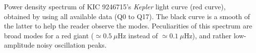 \label{fig:seismo} Power density spectrum of KIC 9246715's \textit{Kepler} light curve (red curve), obtained by using all available data (Q0 to Q17). The black curve is a smooth of the latter to help the reader observe the modes. Peculiarities of this spectrum are broad modes for a red giant ($\simeq0.5\ \mu$Hz instead of $\simeq0.1\ \mu$Hz), and rather low-amplitude noisy oscillation peaks. 
  
  
  
  
  